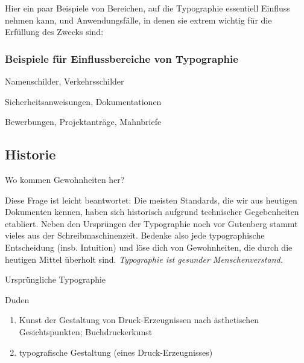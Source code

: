 Hier ein paar Beispiele von Bereichen, auf die Typographie
essentiell Einfluss nehmen kann, und Anwendungsfälle, in denen sie
extrem wichtig für die Erfüllung des Zwecks sind:
\begin{frame}
  \frametitle<presentation>{Beispiele für Einflussbereiche von Typographie}
  \begin{description}[Aufmerksamkeit]
  \item[Lesbarkeit] 
    Namenschilder, 
    Verkehrsschilder
  \item[Wachsamkeit] 
    Sicherheitsanweisungen, 
    Dokumentationen
  \item[Aufmerksamkeit] 
    Bewerbungen,
    Projektanträge,
    Mahnbriefe
  \end{description}
\end{frame}


\subsection{Historie}
\begin{frame}
  \subsectionpage
  
  \centering
  Wo kommen Gewohnheiten her?
\end{frame}

Diese Frage ist leicht beantwortet: Die meisten Standards, die wir aus
heutigen Dokumenten kennen, haben sich historisch aufgrund technischer
Gegebenheiten etabliert.
Neben den Ursprüngen der Typographie noch vor Gutenberg stammt vieles
aus der Schreibmaschinenzeit.
Bedenke also jede typographische Entscheidung (insb. Intuition) und
löse dich von Gewohnheiten, die durch die heutigen Mittel überholt
sind.
\emph{Typographie ist gesunder Menschenverstand.}

\begin{frame}{Ursprüngliche Typographie}
  \begin{block}{Duden}
    \begin{enumerate}
    \item Kunst der Gestaltung von Druck-Erzeugnissen nach
      ästhetischen Gesichtspunkten; \alert{Buchdruckerkunst}
    \item typografische Gestaltung (eines Druck-Erzeugnisses)
    \end{enumerate}
  \end{block}
\end{frame}

